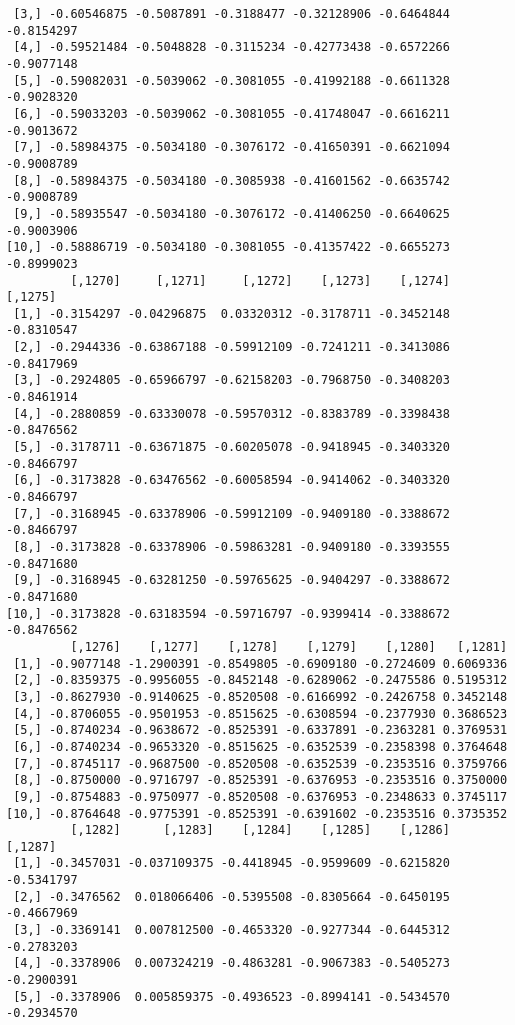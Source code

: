 \documentclass[
  letterpaper,
  DIV=11,
  numbers=noendperiod]{scrreprt}
\begin{document}
\begin{verbatim}
 [3,] -0.60546875 -0.5087891 -0.3188477 -0.32128906 -0.6464844 -0.8154297
 [4,] -0.59521484 -0.5048828 -0.3115234 -0.42773438 -0.6572266 -0.9077148
 [5,] -0.59082031 -0.5039062 -0.3081055 -0.41992188 -0.6611328 -0.9028320
 [6,] -0.59033203 -0.5039062 -0.3081055 -0.41748047 -0.6616211 -0.9013672
 [7,] -0.58984375 -0.5034180 -0.3076172 -0.41650391 -0.6621094 -0.9008789
 [8,] -0.58984375 -0.5034180 -0.3085938 -0.41601562 -0.6635742 -0.9008789
 [9,] -0.58935547 -0.5034180 -0.3076172 -0.41406250 -0.6640625 -0.9003906
[10,] -0.58886719 -0.5034180 -0.3081055 -0.41357422 -0.6655273 -0.8999023
         [,1270]     [,1271]     [,1272]    [,1273]    [,1274]    [,1275]
 [1,] -0.3154297 -0.04296875  0.03320312 -0.3178711 -0.3452148 -0.8310547
 [2,] -0.2944336 -0.63867188 -0.59912109 -0.7241211 -0.3413086 -0.8417969
 [3,] -0.2924805 -0.65966797 -0.62158203 -0.7968750 -0.3408203 -0.8461914
 [4,] -0.2880859 -0.63330078 -0.59570312 -0.8383789 -0.3398438 -0.8476562
 [5,] -0.3178711 -0.63671875 -0.60205078 -0.9418945 -0.3403320 -0.8466797
 [6,] -0.3173828 -0.63476562 -0.60058594 -0.9414062 -0.3403320 -0.8466797
 [7,] -0.3168945 -0.63378906 -0.59912109 -0.9409180 -0.3388672 -0.8466797
 [8,] -0.3173828 -0.63378906 -0.59863281 -0.9409180 -0.3393555 -0.8471680
 [9,] -0.3168945 -0.63281250 -0.59765625 -0.9404297 -0.3388672 -0.8471680
[10,] -0.3173828 -0.63183594 -0.59716797 -0.9399414 -0.3388672 -0.8476562
         [,1276]    [,1277]    [,1278]    [,1279]    [,1280]   [,1281]
 [1,] -0.9077148 -1.2900391 -0.8549805 -0.6909180 -0.2724609 0.6069336
 [2,] -0.8359375 -0.9956055 -0.8452148 -0.6289062 -0.2475586 0.5195312
 [3,] -0.8627930 -0.9140625 -0.8520508 -0.6166992 -0.2426758 0.3452148
 [4,] -0.8706055 -0.9501953 -0.8515625 -0.6308594 -0.2377930 0.3686523
 [5,] -0.8740234 -0.9638672 -0.8525391 -0.6337891 -0.2363281 0.3769531
 [6,] -0.8740234 -0.9653320 -0.8515625 -0.6352539 -0.2358398 0.3764648
 [7,] -0.8745117 -0.9687500 -0.8520508 -0.6352539 -0.2353516 0.3759766
 [8,] -0.8750000 -0.9716797 -0.8525391 -0.6376953 -0.2353516 0.3750000
 [9,] -0.8754883 -0.9750977 -0.8520508 -0.6376953 -0.2348633 0.3745117
[10,] -0.8764648 -0.9775391 -0.8525391 -0.6391602 -0.2353516 0.3735352
         [,1282]      [,1283]    [,1284]    [,1285]    [,1286]    [,1287]
 [1,] -0.3457031 -0.037109375 -0.4418945 -0.9599609 -0.6215820 -0.5341797
 [2,] -0.3476562  0.018066406 -0.5395508 -0.8305664 -0.6450195 -0.4667969
 [3,] -0.3369141  0.007812500 -0.4653320 -0.9277344 -0.6445312 -0.2783203
 [4,] -0.3378906  0.007324219 -0.4863281 -0.9067383 -0.5405273 -0.2900391
 [5,] -0.3378906  0.005859375 -0.4936523 -0.8994141 -0.5434570 -0.2934570

\end{verbatim}
\end{document}
